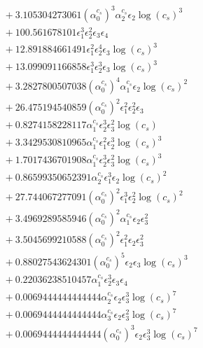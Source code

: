 \documentclass[10pt]{article}
\begin{document}
\begin{align*}
&{}  + 3.105304273061 \left(\alpha_{0}^{c_s}\right)^{3} \alpha_{2}^{c_s} \epsilon_{2} \log{\left(c_{s} \right)}^{3} \\
&{}  + 100.561678101 \epsilon_{1}^{3} \epsilon_{2}^{2} \epsilon_{3} \epsilon_{4} \\
&{}  + 12.891884661491 \epsilon_{1}^{2} \epsilon_{2}^{4} \epsilon_{3} \log{\left(c_{s} \right)}^{3} \\
&{}  + 13.099091166858 \epsilon_{1}^{3} \epsilon_{2}^{3} \epsilon_{3} \log{\left(c_{s} \right)}^{3} \\
&{}  + 3.2827800507038 \left(\alpha_{0}^{c_s}\right)^{4} \alpha_{1}^{c_s} \epsilon_{2} \log{\left(c_{s} \right)}^{2} \\
&{}  + 26.475194540859 \left(\alpha_{0}^{c_s}\right)^{2} \epsilon_{1}^{2} \epsilon_{2}^{2} \epsilon_{3} \\
&{}  + 0.8274158228117 \alpha_{1}^{c_s} \epsilon_{2}^{3} \epsilon_{3}^{2} \log{\left(c_{s} \right)} \\
&{}  + 3.3429530810965 \alpha_{1}^{c_s} \epsilon_{1}^{2} \epsilon_{2}^{3} \log{\left(c_{s} \right)}^{3} \\
&{}  + 1.7017436701908 \alpha_{1}^{c_s} \epsilon_{2}^{3} \epsilon_{3}^{2} \log{\left(c_{s} \right)}^{3} \\
&{}  + 0.86599350652391 \alpha_{2}^{c_s} \epsilon_{1}^{3} \epsilon_{2} \log{\left(c_{s} \right)}^{2} \\
&{}  + 27.744067277091 \left(\alpha_{0}^{c_s}\right)^{2} \epsilon_{1}^{3} \epsilon_{2}^{2} \log{\left(c_{s} \right)}^{2} \\
&{}  + 3.4969289585946 \left(\alpha_{0}^{c_s}\right)^{2} \alpha_{1}^{c_s} \epsilon_{2} \epsilon_{3}^{2} \\
&{}  + 3.5045699210588 \left(\alpha_{0}^{c_s}\right)^{2} \epsilon_{1}^{2} \epsilon_{2} \epsilon_{3}^{2} \\
&{}  + 0.88027543624301 \left(\alpha_{0}^{c_s}\right)^{5} \epsilon_{2} \epsilon_{3} \log{\left(c_{s} \right)}^{3} \\
&{}  + 0.22036238510457 \alpha_{1}^{c_s} \epsilon_{2}^{3} \epsilon_{3} \epsilon_{4} \\
&{}  + 0.0069444444444444 \alpha_{2}^{c_s} \epsilon_{2} \epsilon_{3}^{3} \log{\left(c_{s} \right)}^{7} \\
&{}  + 0.0069444444444444 \alpha_{3}^{c_s} \epsilon_{2} \epsilon_{3}^{2} \log{\left(c_{s} \right)}^{7} \\
&{}  + 0.0069444444444444 \left(\alpha_{0}^{c_s}\right)^{3} \epsilon_{2} \epsilon_{3}^{3} \log{\left(c_{s} \right)}^{7} \\

\end{align*}
\end{document}
